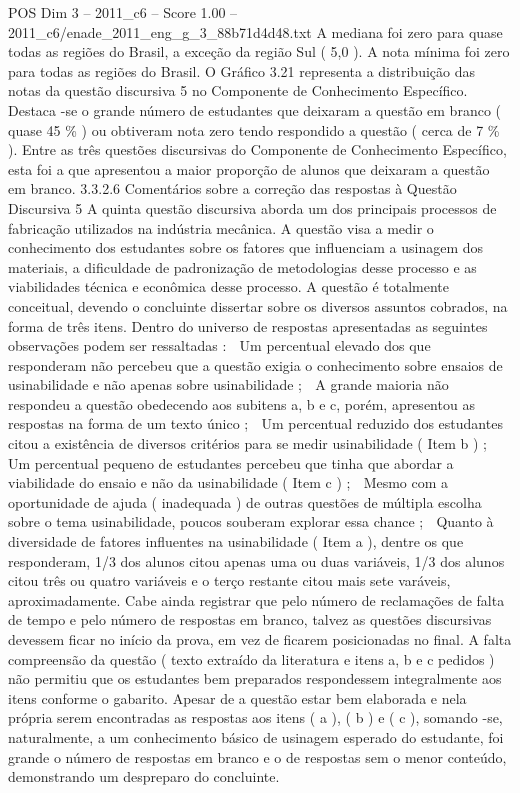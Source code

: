 \begin{textsample}{POS Dim 3 – 2011\_c6 – Score 1.00 – 2011\_c6/enade\_2011\_eng\_g\_3\_88b71d4d48.txt}
A mediana foi zero para quase todas as regiões do Brasil, a exceção da região Sul ( 5,0 ).
A nota mínima foi zero para todas as regiões do Brasil.
O Gráfico 3.21 representa a distribuição das notas da questão discursiva 5 no Componente de Conhecimento Específico.
Destaca -se o grande número de estudantes que deixaram a questão em branco ( quase 45 \% ) ou obtiveram nota zero tendo respondido a questão ( cerca de 7 \% ).
Entre as três questões discursivas do Componente de Conhecimento Específico, esta foi a que apresentou a maior proporção de alunos que deixaram a questão em branco. 3.3.2.6 Comentários sobre a correção das respostas à Questão Discursiva 5 A quinta questão discursiva aborda um dos principais processos de fabricação utilizados na indústria mecânica.
A questão visa a medir o conhecimento dos estudantes sobre os fatores que influenciam a usinagem dos materiais, a dificuldade de padronização de metodologias desse processo e as viabilidades técnica e econômica desse processo.
A questão é totalmente conceitual, devendo o concluinte dissertar sobre os diversos assuntos cobrados, na forma de três itens.
Dentro do universo de respostas apresentadas as seguintes observações podem ser ressaltadas :  Um percentual elevado dos que responderam não percebeu que a questão exigia o conhecimento sobre ensaios de usinabilidade e não apenas sobre usinabilidade ;  A grande maioria não respondeu a questão obedecendo aos subitens a, b e c, porém, apresentou as respostas na forma de um texto único ;  Um percentual reduzido dos estudantes citou a existência de diversos critérios para se medir usinabilidade ( Item b ) ;  Um percentual pequeno de estudantes percebeu que tinha que abordar a viabilidade do ensaio e não da usinabilidade ( Item c ) ;  Mesmo com a oportunidade de ajuda ( inadequada ) de outras questões de múltipla escolha sobre o tema usinabilidade, poucos souberam explorar essa chance ;  Quanto à diversidade de fatores influentes na usinabilidade ( Item a ), dentre os que responderam, 1/3 dos alunos citou apenas uma ou duas variáveis, 1/3 dos alunos citou três ou quatro variáveis e o terço restante citou mais sete varáveis, aproximadamente.
Cabe ainda registrar que pelo número de reclamações de falta de tempo e pelo número de respostas em branco, talvez as questões discursivas devessem ficar no início da prova, em vez de ficarem posicionadas no final.
A falta compreensão da questão ( texto extraído da literatura e itens a, b e c pedidos ) não permitiu que os estudantes bem preparados respondessem integralmente aos itens conforme o gabarito.
Apesar de a questão estar bem elaborada e nela própria serem encontradas as respostas aos itens ( a ), ( b ) e ( c ), somando -se, naturalmente, a um conhecimento básico de usinagem esperado do estudante, foi grande o número de respostas em branco e o de respostas sem o menor conteúdo, demonstrando um despreparo do concluinte.

\end{textsample}
